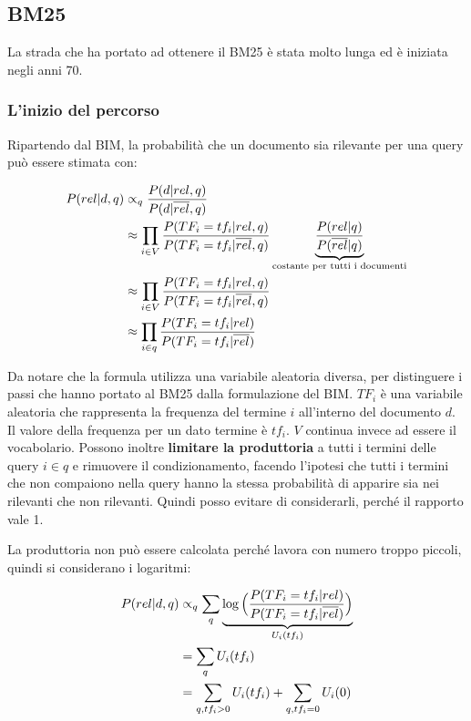

\subsection{BM25}

La strada che ha portato ad ottenere il BM25 è stata molto lunga ed è iniziata negli anni 70.

\subsubsection{L'inizio del percorso}

Ripartendo dal BIM, la probabilità che un documento sia rilevante per una query può essere stimata con: 

\begin{align}
P(rel | d,q) &\propto_q \frac{P(d|rel, q)}{P(d| \overline{rel}, q)} \\ 
&\approx \prod_{i \in V} \frac{P(TF_i=tf_i|rel,q)}{P(TF_i=tf_i | \overline{rel}, q)} \underbrace{\frac{P(rel|q)}{P(\overline{rel} |q )}}_{\text{costante per tutti i documenti}} \nonumber  \\
&\approx \prod_{i \in V} \frac{P(TF_i = tf_i|rel,q)}{P(TF_i=tf_i|\overline{rel},q)}\nonumber \\
&\approx \prod_{i \in q} \frac{P(TF_i = tf_i|rel)}{P(TF_i=tf_i|\overline{rel})}
\end{align}

Da notare che la formula utilizza una variabile aleatoria diversa, per distinguere i passi che hanno portato al BM25 dalla formulazione del BIM. $TF_i$ è una variabile aleatoria che rappresenta la frequenza del termine $i$ all'interno del documento $d$. Il valore della frequenza per un dato termine è $tf_i$. $V$ continua invece ad essere il vocabolario.
Possono inoltre \textbf{limitare la produttoria} a tutti i termini delle query $i \in q$ e rimuovere il condizionamento, facendo l'ipotesi che tutti i termini che non compaiono nella query hanno la stessa probabilità di apparire sia nei rilevanti che non rilevanti. Quindi posso evitare di considerarli, perché il rapporto vale 1.

La produttoria non può essere calcolata perché lavora con numero troppo piccoli, quindi si considerano i logaritmi:

\begin{align}
P(rel | d,q) &\propto_q \sum_q \underbrace{\log \Big(  \frac{P(TF_i=tf_i | rel)}{P(TF_i=tf_i | \overline{rel} )} \Big)}_{U_i(tf_i)} \\ 
&= \sum\limits_q U_i(tf_i) \\
&= \sum_{q,tf_i > 0} U_i(tf_i) + \sum_{q,tf_i = 0} U_i(0)
\end{align}


